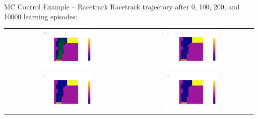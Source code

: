 \documentclass[ignorenonframetext,xcolor=x11names]{beamer}
\begin{document}
\begin{frame}[fragile]{MC Control Example -- Racetrack}
Racetrack trajectory after 0, 100, 200, and 10000 learning episodes:
\vspace{.5\baselineskip}

\begin{center}
\begin{tabular}{cc}
\includegraphics[width=0.45\textwidth]{rl_into/racetrack/racetrack_iteration_0.png} &
\includegraphics[width=0.45\textwidth]{rl_into/racetrack/racetrack_iteration_100.png} \\
\includegraphics[width=0.45\textwidth]{rl_into/racetrack/racetrack_iteration_200.png} &
\includegraphics[width=0.45\textwidth]{rl_into/racetrack/racetrack_iteration_10000.png}
\end{tabular}
\end{center}
\end{frame}
\end{document}
